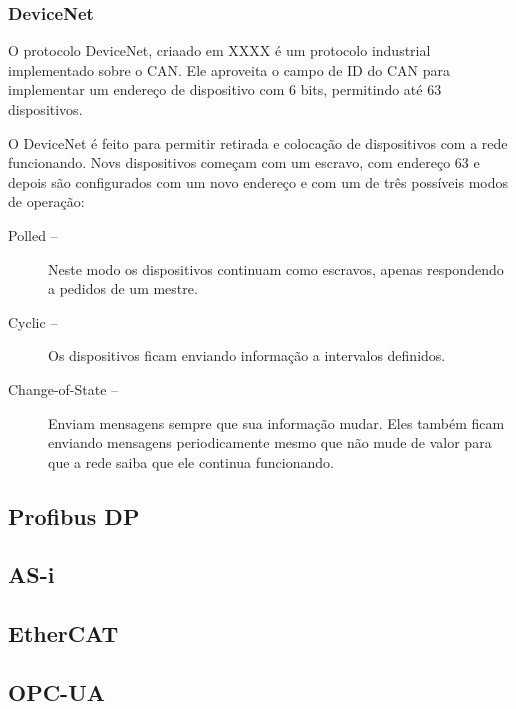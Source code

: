 \subsubsection{DeviceNet}
O protocolo DeviceNet, criaado em XXXX é um protocolo industrial implementado sobre o CAN. Ele aproveita o campo de ID do CAN para implementar um endereço de dispositivo com 6 bits, permitindo até 63 dispositivos.

O DeviceNet é feito para permitir retirada e colocação de dispositivos com a rede funcionando. Novs dispositivos começam com um escravo, com endereço 63 e depois são configurados com um novo endereço e com um de três possíveis modos de operação:
\begin{description}
    \item[Polled -- ]Neste modo os dispositivos continuam como escravos, apenas respondendo a pedidos de um mestre.
    \item[Cyclic -- ]Os dispositivos ficam enviando informação a intervalos definidos.
    \item[Change-of-State --] Enviam mensagens sempre que sua informação mudar. Eles também ficam enviando mensagens periodicamente mesmo que não mude de valor para que a rede saiba que ele continua funcionando.
\end{description}

\subsection{Profibus DP}



\subsection{AS-i}



\subsection{EtherCAT}



\subsection{OPC-UA}


